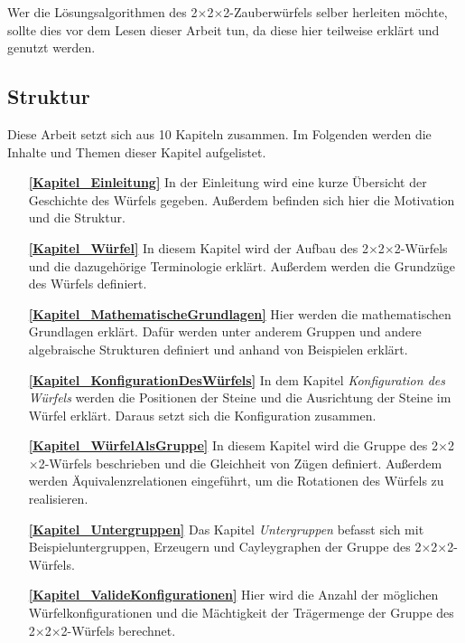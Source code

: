 \documentclass[12pt,a4paper, usenames, dvipsnames]{article}
\theoremstyle{mystyle}
\theoremstyle{definition}
\newcommand{\Ttwo}{2$\times$2$\times$2-}
\begin{document}
Wer die Lösungsalgorithmen des \Ttwo Zauberwürfels selber herleiten möchte, sollte dies vor dem Lesen dieser Arbeit tun, da diese hier teilweise erklärt und genutzt werden.

%
%
%
%
%
%
%
%
\subsection{Struktur} 

Diese Arbeit setzt sich aus 10 Kapiteln zusammen. Im Folgenden werden die Inhalte und Themen dieser Kapitel aufgelistet.

\begin{itemize}
\item[\textbf{\ref{Kapitel_Einleitung}}] In der Einleitung wird eine kurze Übersicht der Geschichte des Würfels gegeben. Außerdem befinden sich hier die Motivation und die Struktur.

\item[\textbf{\ref{Kapitel_Würfel}}] In diesem Kapitel wird der Aufbau des \Ttwo Würfels und die dazugehörige Terminologie erklärt. Außerdem werden die Grundzüge des Würfels definiert.

\item[\textbf{\ref{Kapitel_MathematischeGrundlagen}}] Hier werden die mathematischen Grundlagen erklärt. Dafür werden unter anderem Gruppen und andere algebraische Strukturen definiert und anhand von Beispielen erklärt.

\item[\textbf{\ref{Kapitel_KonfigurationDesWürfels}}] In dem Kapitel \textit{Konfiguration des Würfels} werden die Positionen der Steine und die Ausrichtung der Steine im Würfel erklärt. Daraus setzt sich die Konfiguration zusammen. 

\item[\textbf{\ref{Kapitel_WürfelAlsGruppe}}] In diesem Kapitel wird die Gruppe des \Ttwo Würfels beschrieben und die Gleichheit von Zügen definiert. Außerdem werden Äquivalenzrelationen eingeführt, um die Rotationen des Würfels zu realisieren.

\item[\textbf{\ref{Kapitel_Untergruppen}}] Das Kapitel \textit{Untergruppen} befasst sich mit Beispieluntergruppen, Erzeugern und Cayleygraphen der Gruppe des \Ttwo Würfels.

\item[\textbf{\ref{Kapitel_ValideKonfigurationen}}] Hier wird die Anzahl der möglichen Würfelkonfigurationen und die Mächtigkeit der Trägermenge der Gruppe des \Ttwo Würfels berechnet.


\end{itemize}
\end{document}

